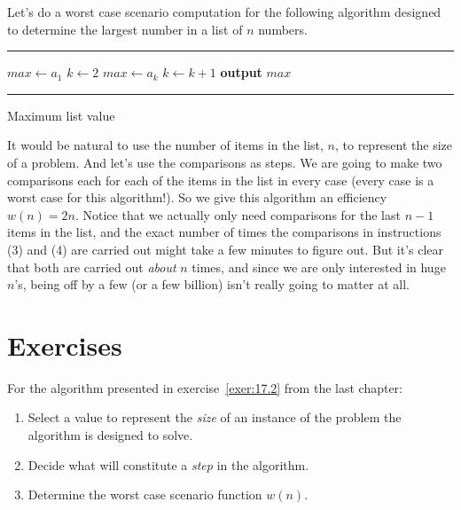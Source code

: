 \begin{exmp}
Let's do a worst case scenario computation
for the following algorithm designed to determine the largest
number in a list of $n$ numbers.
\begin{algrthm}
  \hrule\kern5pt\relax
  \begin{algorithmic}[1]
     \State $max \gets a_1$
     \State $ k \gets 2$
       \State $max \gets a_k$
       \State $k \gets k+1$
      \EndIf
     \EndWhile
     \State \textbf{output} $max$
  \end{algorithmic}
  \hrule\kern5pt\relax
  \caption{Maximum list value}\label{alg:max list val}
\end{algrthm}
%
%
%
%
%

It would be natural to use the number of items in the list, $n$, to represent
the size of a problem. And let's use the comparisons as steps. We are
going to make two comparisons each for each of the items in the list
in every case (every case is a worst case for this algorithm!).
So we give this algorithm an efficiency $w(n) =2n$.
Notice that we actually only need comparisons for the last $n-1$ items
in the list, and the exact number of times the comparisons in instructions
(3) and (4) are carried out might take a few minutes to figure out.
But it's clear that both are carried out {\itshape about} $n$ times, and
since we are only interested in huge $n$'s, being off by a few (or a few
billion) isn't really going to matter at all.
\end{exmp}

\clearpage

\section{Exercises}

\begin{exer}\label{exer:18.1}
For the algorithm presented in exercise~\ref{exer:17.2} from the last chapter:
\begin{enumerate}[label=(\alph*)]
 \item Select a value to represent the {\itshape size} of an instance of the 
 problem the algorithm is designed to solve. 
 
 \item Decide what will constitute a {\itshape step} in the algorithm.
 
 \item Determine the worst case scenario function $w(n)$.
\end{enumerate}
\end{exer}


